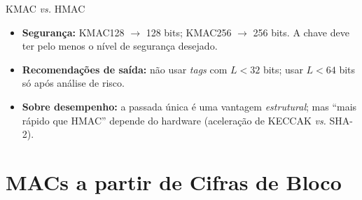 \documentclass{beamer}
\begin{document}
\begin{frame}{KMAC \textit{vs.} HMAC}
    \begin{center}
        \small
    \end{center}
    \medskip
    \begin{itemize}
        \footnotesize
        \item \textbf{Segurança:} KMAC128 $\to$ 128 bits; KMAC256 $\to$ 256 bits. A chave deve ter pelo menos o nível de segurança desejado.
        \item \textbf{Recomendações de saída:} não usar \textit{tags} com $L < 32$ bits; usar $L < 64$ bits só após análise de risco.
        \item \textbf{Sobre desempenho:} a passada única é uma vantagem \emph{estrutural}; mas ``mais rápido que HMAC'' \alert{depende do hardware} (aceleração de KECCAK \textit{vs.} SHA-2).
    \end{itemize}
\end{frame}

\section{MACs a partir de Cifras de Bloco}
\end{document}
